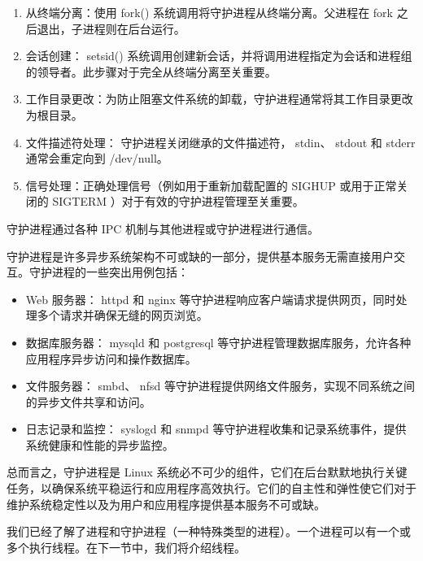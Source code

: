 \begin{enumerate}
\item
从终端分离：使用 fork() 系统调用将守护进程从终端分离。父进程在 fork 之后退出，子进程则在后台运行。

\item
会话创建： setsid() 系统调用创建新会话，并将调用进程指定为会话和进程组的领导者。此步骤对于完全从终端分离至关重要。

\item
工作目录更改：为防止阻塞文件系统的卸载，守护进程通常将其工作目录更改为根目录。

\item
文件描述符处理： 守护进程关闭继承的文件描述符， stdin、 stdout 和 stderr 通常会重定向到 /dev/null。

\item
信号处理：正确处理信号（例如用于重新加载配置的 SIGHUP 或用于正常关闭的 SIGTERM ）对于有效的守护进程管理至关重要。
\end{enumerate}

守护进程通过各种 IPC 机制与其他进程或守护进程进行通信。

守护进程是许多异步系统架构不可或缺的一部分，提供基本服务无需直接用户交互。守护进程的一些突出用例包括：

\begin{itemize}
\item
Web 服务器： httpd 和 nginx 等守护进程响应客户端请求提供网页，同时处理多个请求并确保无缝的网页浏览。

\item
数据库服务器： mysqld 和 postgresql 等守护进程管理数据库服务，允许各种应用程序异步访问和操作数据库。

\item
文件服务器： smbd、 nfsd 等守护进程提供网络文件服务，实现不同系统之间的异步文件共享和访问。

\item
日志记录和监控： syslogd 和 snmpd 等守护进程收集和记录系统事件，提供系统健康和性能的异步监控。
\end{itemize}

总而言之，守护进程是 Linux 系统必不可少的组件，它们在后台默默地执行关键任务，以确保系统平稳运行和应用程序高效执行。它们的自主性和弹性使它们对于维护系统稳定性以及为用户和应用程序提供基本服务不可或缺。

我们已经了解了进程和守护进程（一种特殊类型的进程）。一个进程可以有一个或多个执行线程。在下一节中，我们将介绍线程。







